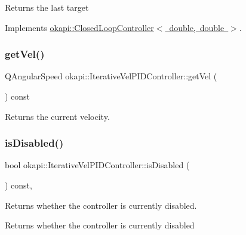 \begin{DoxyReturn}{Returns}
the last target 
\end{DoxyReturn}


Implements \mbox{\hyperlink{classokapi_1_1ClosedLoopController_a22012bedbfaff6e5a3a508f274ec2497}{okapi\+::\+Closed\+Loop\+Controller$<$ double, double $>$}}.

\mbox{\label{classokapi_1_1IterativeVelPIDController_a0f00d299a6cbe11eaad67fb994486c39}} 
\subsubsection{\texorpdfstring{getVel()}{getVel()}}
{\footnotesize\ttfamily Q\+Angular\+Speed okapi\+::\+Iterative\+Vel\+P\+I\+D\+Controller\+::get\+Vel (\begin{DoxyParamCaption}{ }\end{DoxyParamCaption}) const\hspace{0.3cm}{\ttfamily [virtual]}}

Returns the current velocity. \mbox{\label{classokapi_1_1IterativeVelPIDController_a628a5093634f85d788015c4cc1353c54}} 
\subsubsection{\texorpdfstring{isDisabled()}{isDisabled()}}
{\footnotesize\ttfamily bool okapi\+::\+Iterative\+Vel\+P\+I\+D\+Controller\+::is\+Disabled (\begin{DoxyParamCaption}{ }\end{DoxyParamCaption}) const\hspace{0.3cm}{\ttfamily [override]}, {\ttfamily [virtual]}}

Returns whether the controller is currently disabled.

\begin{DoxyReturn}{Returns}
whether the controller is currently disabled 
\end{DoxyReturn}


